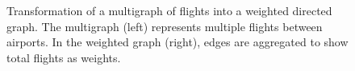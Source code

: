 \begin{figure}[h]
  \caption{Transformation of a multigraph of flights into a weighted directed graph. The multigraph (left) represents multiple flights between airports. In the weighted graph (right), edges are aggregated to show total flights as weights.}
  \label{fig:multigraph_to_weighted_graph}
\end{figure}
